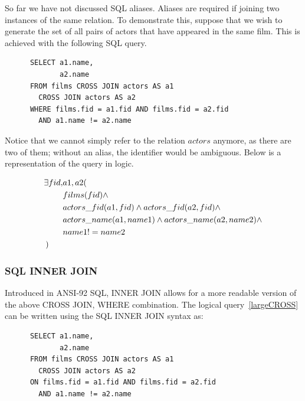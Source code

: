 \documentclass[a4paper, 11pt]{article}
\begin{document}
      So far we have not discussed SQL aliases. Aliases are required if joining
      two instances of the same relation. To demonstrate this, suppose that we
      wish to generate the set of all pairs of actors that have appeared in the
      same film. This is achieved with the following SQL query.

      \begin{verbatim}
      SELECT a1.name,
             a2.name
      FROM films CROSS JOIN actors AS a1
        CROSS JOIN actors AS a2
      WHERE films.fid = a1.fid AND films.fid = a2.fid 
        AND a1.name != a2.name
      \end{verbatim}

      Notice that we cannot simply refer to the relation $actors$ anymore, as
      there are two of them; without an alias, the identifier would be
      ambiguous. Below is a representation of the query in logic.

      \begin{align}
          \exists fid, & a1, a2(  \nonumber\\
                       & films(fid) \land \nonumber\\
                       & actors\_fid(a1, fid) \land actors\_fid(a2, fid) \land \nonumber\\
                       & actors\_name(a1, name1) \land actors\_name(a2, name2) \land \nonumber\\
                       & name1 != name2 \nonumber\\
        ) \hspace{6mm} &  %
        \label{largeCROSS}
      \end{align}


    \subsubsection{SQL INNER JOIN}

      Introduced in ANSI-92 SQL, INNER JOIN allows for a more readable version of
      the above CROSS JOIN, WHERE combination. The logical query~\ref{largeCROSS}
      can be written using the SQL INNER JOIN syntax as:

      \begin{verbatim}
      SELECT a1.name,
             a2.name
      FROM films CROSS JOIN actors AS a1
        CROSS JOIN actors AS a2
      ON films.fid = a1.fid AND films.fid = a2.fid 
        AND a1.name != a2.name
      \end{verbatim}
\end{document}
